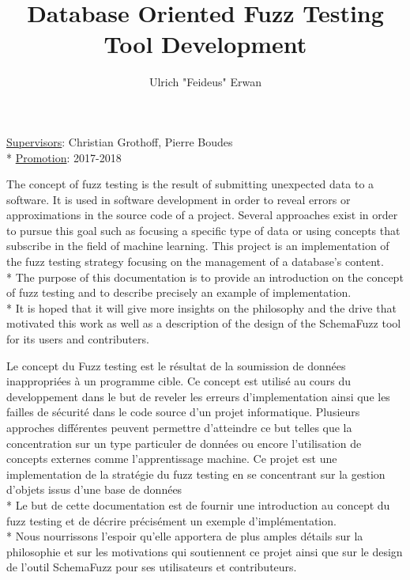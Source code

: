 \documentclass{article}
\title{Database Oriented Fuzz Testing Tool Development}
\author{Ulrich "Feideus" Erwan}
\newcommand\tab[1][1cm]{\hspace*{#1}}
\begin{document}
\begin{empfile}

\maketitle

\vspace*{\fill}
\underline{Supervisors}: Christian Grothoff, Pierre Boudes 	\\*
\tab[0.4cm] \underline{Promotion}: 2017-2018
\clearpage

\tableofcontents
\clearpage

	\abstract
The concept of fuzz testing is the result of submitting unexpected data to a software. It is used in software development in order to reveal errors or approximations in the source code of a project. Several approaches exist in order to pursue this goal such as focusing a specific type of data or using concepts that subscribe in the field of machine learning. This project is an implementation of the fuzz testing strategy focusing on the management of a database's content.  \\*
The purpose of this documentation is to provide an introduction on the concept of fuzz testing and to describe precisely an example of implementation. \\*
It is hoped that it will give more insights on the philosophy and the drive that motivated this work as well as a description of the design of the SchemaFuzz tool for its users and contributers.

\bigskip

Le concept du Fuzz testing est le résultat de la soumission de données inappropriées à un programme cible. Ce concept est utilisé au cours du developpement dans le but de reveler les erreurs d'implementation ainsi que les failles de sécurité dans le code source d'un projet informatique. Plusieurs approches différentes peuvent permettre d'atteindre ce but telles que la concentration sur un type particuler de données ou encore l'utilisation de concepts externes comme l'apprentissage machine. Ce projet est une implementation de la stratégie du fuzz testing en se concentrant sur la gestion d'objets issus d'une base de données \\*
Le but de cette documentation est de fournir une introduction au concept du fuzz testing et de décrire précisément un exemple d'implémentation. \\*
Nous nourrissons l'espoir qu'elle apportera de plus amples détails sur la philosophie et sur les motivations qui soutiennent ce projet ainsi que sur le design de l'outil SchemaFuzz pour ses utilisateurs et contributeurs. 


\end{empfile}
\end{document}
